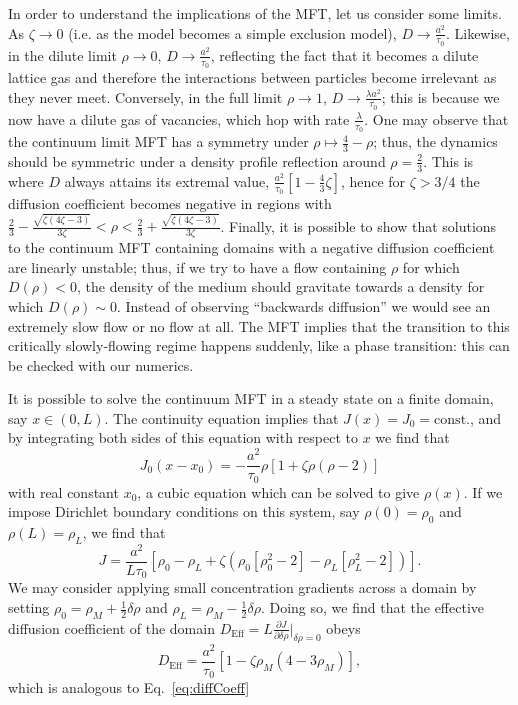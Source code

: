 \documentclass[
reprint,
 amsmath,amssymb,
 aps,
 prl,
]{revtex4-1}
\newcommand{\partDeriv}[2]{\frac{\partial #1}{\partial #2}}
\begin{document}
In order to understand the implications of the MFT, let us consider some limits. As $\zeta \rightarrow 0$ (i.e. as the model becomes a simple exclusion model), $D \rightarrow \frac{a^2}{\tau_0}$. Likewise, in the
dilute limit $\rho \rightarrow 0$, $D \rightarrow \frac{ a^2}{\tau_0}$, reflecting the fact that it becomes a dilute lattice gas and therefore the interactions between particles become irrelevant as they never meet.
Conversely, in the full limit $\rho \rightarrow 1$, $D \rightarrow \frac{\lambda a^2}{\tau_0}$; this is because we now have a dilute gas of vacancies, which hop with rate $\frac{\lambda}{\tau_0}$.
One may observe that the continuum limit MFT has a symmetry under $\rho \mapsto \frac{4}{3} - \rho$; thus, the dynamics should be symmetric under a density profile reflection around $\rho = \frac{2}{3}$. This is where $D$ always
attains its extremal value, $ \frac{a^2}{\tau_0}\left[1 - \frac{4}{3}\zeta\right]$, hence for $\zeta>3/4$ the diffusion coefficient becomes negative in regions with
$\frac{2}{3} - \frac{\sqrt{\zeta\left(4\zeta - 3\right)}}{3\zeta} < \rho < \frac{2}{3} + \frac{\sqrt{\zeta\left(4\zeta - 3\right)}}{3\zeta}$.
Finally, it is possible to show that solutions to the continuum MFT containing domains with a negative diffusion coefficient are linearly unstable; thus, if we try to have a flow containing $\rho$ for which $D(\rho)<0$,
the density of the medium should gravitate towards a density for which $D(\rho)\sim 0$. Instead of observing ``backwards diffusion'' we would see an extremely slow flow or no flow at all. The MFT implies that the transition
to this critically slowly-flowing regime happens suddenly, like a phase transition: this can be checked with our numerics.

It is possible to solve the continuum MFT in a steady state on a finite domain, say $x\in(0, L)$. The continuity equation implies that $J(x)=J_0=\mathrm{const.}$, and by integrating both sides of this equation with respect to $x$ we find that
\begin{equation}
 J_0 (x-x_0) = -\frac{a^2}{\tau_0} \rho \left[1+\zeta \rho\left(\rho-2\right)\right]
\end{equation}
with real constant $x_0$,
a cubic equation which can be solved to give $\rho(x)$. If we impose Dirichlet boundary conditions on this system, say $\rho(0)=\rho_0$ and $\rho(L)=\rho_L$, we find that
\begin{equation}
 J = \frac{a^2}{L \tau_0} \left[ \rho_0 - \rho_L + \zeta \left( \rho_0\left[\rho_0^2-2\right] - \rho_L\left[\rho_L^2-2\right] \right) \right].
\end{equation}
We may consider applying small concentration gradients across a domain by setting $\rho_0 = \rho_M + \frac{1}{2}\delta\rho$ and $\rho_L = \rho_M - \frac{1}{2}\delta\rho$. Doing so, we find that the effective diffusion coefficient of the domain
$D_\mathrm{Eff}=L \partDeriv{J}{\delta\rho}\big|_{\delta\rho=0}$ obeys
\begin{equation}
\label{eq:MFTflow}
 D_\mathrm{Eff} = \frac{a^2}{ \tau_0} \left[ 1 - \zeta\rho_M(4-3\rho_M) \right],
\end{equation}
which is analogous to Eq.~\ref{eq:diffCoeff}
\end{document}
